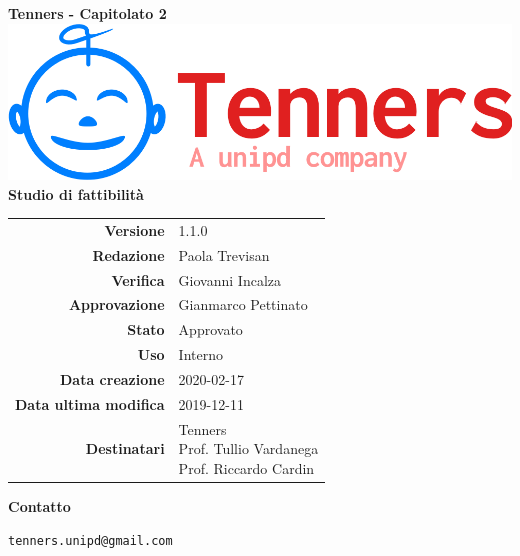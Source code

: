 \begin{titlepage}
	\begin{center}
		\large \textbf{Tenners - Capitolato 2}
		\vfill
		\includegraphics[scale = 0.3]{./res/img/logo.png}\\
		\vfill
		\Huge \textbf{Studio di fattibilità}

        \vfill
        \large

        \begin{tabular}{r|l}
                        \textbf{Versione} & 1.1.0 \\
                        \textbf{Redazione} &
                        Paola Trevisan \\
                        \textbf{Verifica} & 
                        Giovanni Incalza \\
                        \textbf{Approvazione} & Gianmarco Pettinato \\
                        \textbf{Stato} & Approvato \\
                        \textbf{Uso} &  Interno\\
                        \textbf{Data creazione} &  2020-02-17\\
                        \textbf{Data ultima modifica} & 2019-12-11 \\
                        \textbf{Destinatari} & \parbox[t]{5cm}{Tenners\\Prof. Tullio Vardanega\\Prof. Riccardo Cardin}
                \end{tabular}
                \vfill
                \normalsize
                \vfill
                \textbf{Contatto}
                
                \texttt{tenners.unipd@gmail.com}

	\end{center}
\end{titlepage}